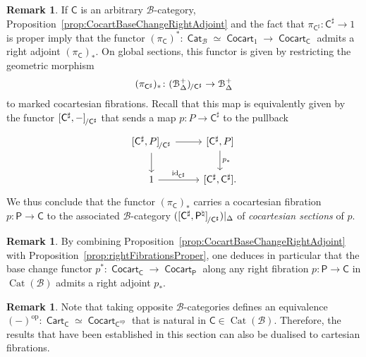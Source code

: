 \documentclass[reqno]{amsart}
\numberwithin{equation}{subsection}
\theoremstyle{plain}
\theoremstyle{definition}
\newtheorem{remark}[equation]{Remark}
\let\scr=\mathcal
\def\BB{\scr B}
\DeclareMathOperator{\id}{id}
\DeclareMathOperator{\Cat}{Cat}
\DeclareMathOperator{\ICat}{\mathsf{Cat}}
\DeclareMathOperator{\ICocart}{\mathsf{Cocart}}
\DeclareMathOperator{\ICart}{\mathsf{Cart}}
\newcommand{\op}{\mathrm{op}}
\newcommand{\Over}[2]{#1_{\hspace{-1pt}/#2}}
\newcommand{\I}[1]{\mathsf{#1}}
\newcommand{\iFun}[2]{{[#1,#2]}}
\newcommand{\mSimp}[1]{#1_{\Delta}^+}
\begin{document}
\begin{remark}
	\label{rem:pushforwardCocartPoint}
	If $\I{C}$ is an arbitrary $\BB$-category, Proposition~\ref{prop:CocartBaseChangeRightAdjoint} and the fact that $\pi_{\I{C}^\sharp}\colon \I{C}^\sharp\to 1$ is proper imply that the functor $(\pi_{\I{C}})^\ast\colon \ICat_{\BB}\simeq\ICocart_{1}\to \ICocart_{\I{C}}$ admits a right adjoint $(\pi_{\I{C}})_\ast$. On global sections, this functor is given by restricting the geometric morphism
	\begin{equation*}
	(\pi_{\I{C}^\sharp})_\ast\colon \Over{(\mSimp\BB)}{\I{C}^\sharp}\to\mSimp\BB
	\end{equation*}
	to marked cocartesian fibrations. Recall that this map is equivalently given by the functor $\Over{\iFun{\I{C}^\sharp}{-}}{\I{C}^\sharp}$ that sends a map $p\colon P\to \I{C}^\sharp$ to the pullback
	\begin{equation*}
	\begin{tikzcd}
	\Over{\iFun{\I{C}^\sharp}{P}}{\I{C}^\sharp}\arrow[r]\arrow[d] & {\iFun{\I{C}^\sharp}{P}}\arrow[d, "p_\ast"]\\
	1\arrow[r, "\id_{\I{C}^\sharp}"] & {\iFun{\I{C}^\sharp}{\I{C}^\sharp}}.
	\end{tikzcd}
	\end{equation*}
	We thus conclude that the functor $(\pi_{\I{C}})_\ast$ carries a cocartesian fibration $p\colon\I{P}\to\I{C}$ to the associated $\BB$-category $(\Over{\iFun{\I{C}^\sharp}{\I{P}^\natural}}{\I{C}^\sharp})\vert_{\Delta}$ of \emph{cocartesian sections} of $p$.
\end{remark}

\begin{remark}
	\label{rem:pushforwardCocartRightFibration}
	By combining Proposition~\ref{prop:CocartBaseChangeRightAdjoint} with Proposition~\ref{prop:rightFibrationsProper}, one deduces in particular that the base change functor $p^\ast\colon \ICocart_{\I{C}}\to\ICocart_{\I{P}}$ along any right fibration $p\colon \I{P}\to\I{C}$ in $\Cat(\BB)$ admits a right adjoint $p_\ast$.
\end{remark}

\begin{remark}
	\label{rem:CartLimitsColimits}
	Note that taking opposite $\BB$-categories defines an equivalence $(-)^\op\colon \ICart_{\I{C}}\simeq\ICocart_{\I{C}^\op}$ that is natural in $\I{C}\in\Cat(\BB)$. Therefore, the results that have been established in this section can also be dualised to cartesian fibrations.
\end{remark}
\end{document}
